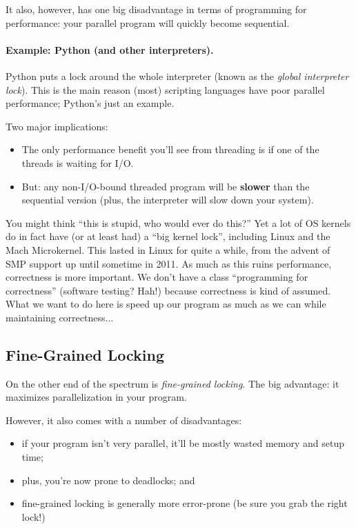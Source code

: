 \documentclass[a4paper]{report}
\begin{document}
It also, however, has one big disadvantage in terms of programming for performance: your parallel program will quickly become sequential.

\paragraph{Example: Python (and other interpreters).}
Python puts a lock around the whole interpreter (known as the
\emph{global interpreter lock}).  This is the main reason (most)
scripting languages have poor parallel performance; Python's just an
example.

Two major implications:
\begin{itemize}
\item The only performance benefit you'll see from threading is if one of the threads is
      waiting for I/O.
\item But: any non-I/O-bound threaded program will be {\bf slower} than the sequential
      version (plus, the interpreter will slow down your system).
\end{itemize}

You might think ``this is stupid, who would ever do this?'' Yet a lot of OS kernels do in fact have (or at least had) a ``big kernel lock'', including Linux and the Mach Microkernel. This lasted in Linux for quite a while, from the advent of SMP support up until sometime in 2011. As much as this ruins performance, correctness is more important. We don't have a class ``programming for correctness'' (software testing? Hah!) because correctness is kind of assumed. What we want to do here is speed up our program as much as we can while maintaining correctness...

\subsection*{Fine-Grained Locking}
On the other end of the spectrum is \emph{fine-grained locking}. The big
advantage: it maximizes parallelization in your program.

However, it also comes with a number of disadvantages:
  \begin{itemize}
    \item if your program isn't very parallel, it'll be mostly wasted memory and setup time;
    \item plus, you're now prone to deadlocks; and
    \item fine-grained locking is generally more error-prone (be sure you grab the right lock!)
  \end{itemize}
\end{document}
